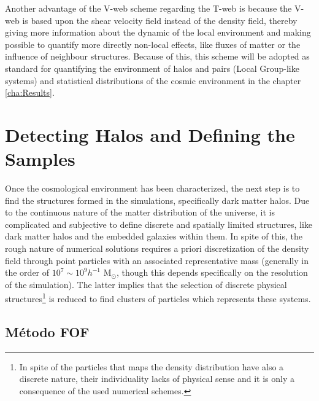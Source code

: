 Another advantage of the V-web scheme regarding the T-web is because the 
V-web is based upon the shear velocity field instead of the density field, 
thereby giving more information about the dynamic of the local environment
and making possible to quantify more directly non-local effects, like fluxes
of matter or the influence of neighbour structures. Because of this, this 
scheme will be adopted as standard for quantifying the environment of halos
and pairs (Local Group-like systems) and statistical distributions of the 
cosmic environment in the chapter \ref{cha:Results}.







\section{Detecting Halos and Defining the Samples}
\label{sec:HalosDetectionAndSampleDefinitions}


Once the cosmological environment has been characterized, the next step is
to find the structures formed in the simulations, specifically dark matter
halos. Due to the continuous nature of the matter distribution of the 
universe, it is complicated and subjective to define discrete and spatially
limited structures, like dark matter halos and the embedded galaxies within
them. In spite of this, the rough nature of numerical solutions requires a 
priori discretization of the density field through point particles with an
associated representative mass (generally in the order of $10^7 
\sim 10^9 h^{-1}$ M$_{\odot}$, though this depends specifically on the 
resolution of the simulation). The latter implies that the selection of 
discrete physical structures\footnote{ In spite of the particles that maps 
the density distribution have also a discrete nature, their individuality 
lacks of physical sense and it is only a consequence of the used numerical 
schemes.} is reduced to find clusters of particles which represents these
systems.


	\subsection{Método FOF}
	\label{subsec:FOFMethod}
	

